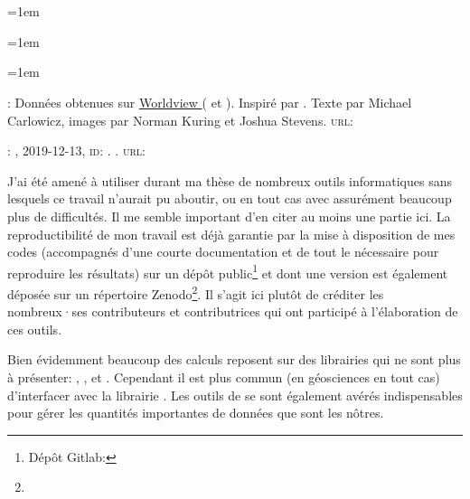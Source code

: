 
\chapter*{\bibname}
\mtcaddchapter[\bibname]
\markboth{\bibname}{}
\label{bib}

{
  \nocite{quenouille_1966}
  \emergencystretch=1em
  \printbibliography[heading=none, filter=normal]
}

\newpage

\unsection{\bibdataTitle}
\label{bib:data}

{
  \emergencystretch=1em
  \printbibliography[heading=none, type=dataset]
}

\label{bib:illustration}

{
  \setlength{\parindent}{0pt}
  \emergencystretch=1em

  : Données obtenues sur \href{https://worldview.earthdata.nasa.gov}{Worldview } ( et ).
  Inspiré par .
  Texte par Michael Carlowicz, images par Norman Kuring et Joshua Stevens.
  \textsc{url:} 

  \medskip

  : , 2019-12-13, \textsc{id}: .
  .
  \textsc{url:} 
}

\unsection{\bibsoftwareTitle}
\label{bib:software}

J'ai été amené à utiliser durant ma thèse de nombreux outils informatiques sans lesquels ce travail n'aurait pu aboutir, ou en tout cas avec assurément beaucoup plus de difficultés.
Il me semble important d'en citer au moins une partie ici.
La reproductibilité de mon travail est déjà garantie par la mise à disposition de mes codes (accompagnés d'une courte documentation et de tout le nécessaire pour reproduire les résultats) sur un dépôt public\footnote{%
  Dépôt Gitlab: }
et dont une version est également déposée sur un répertoire Zenodo\footnote{}.
Il s'agit ici plutôt de créditer les nombreux·ses contributeurs et contributrices qui ont participé à l'élaboration de ces outils.

Bien évidemment beaucoup des calculs reposent sur des librairies qui ne sont plus à présenter: , , et .
Cependant il est plus commun (en géosciences en tout cas) d'interfacer avec la librairie .
Les outils de  se sont également avérés indispensables pour gérer les quantités importantes de données que sont les nôtres.

